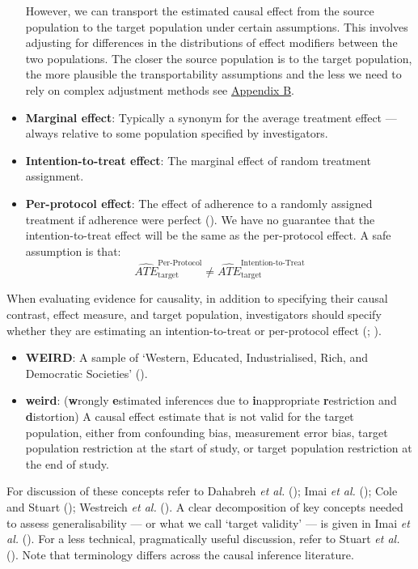 \documentclass[
  single column]{article}
\begin{document}
\begin{itemize}
  However, we can transport the estimated causal effect from the source
  population to the target population under certain assumptions. This
  involves adjusting for differences in the distributions of effect
  modifiers between the two populations. The closer the source
  population is to the target population, the more plausible the
  transportability assumptions and the less we need to rely on complex
  adjustment methods see \hyperref[id-app-b]{Appendix B}.
\item
  \textbf{Marginal effect}: Typically a synonym for the average
  treatment effect --- always relative to some population specified by
  investigators.
\item
  \textbf{Intention-to-treat effect}: The marginal effect of random
  treatment assignment.
\item
  \textbf{Per-protocol effect}: The effect of adherence to a randomly
  assigned treatment if adherence were perfect
  (). We have no
  guarantee that the intention-to-treat effect will be the same as the
  per-protocol effect. A safe assumption is that: \[
  \widehat{ATE}_{\text{target}}^{\text{Per-Protocol}} \ne \widehat{ATE}_{\text{target}}^{\text{Intention-to-Treat}}
  \]
\end{itemize}

When evaluating evidence for causality, in addition to specifying their
causal contrast, effect measure, and target population, investigators
should specify whether they are estimating an intention-to-treat or
per-protocol effect (;
).

\begin{itemize}
\item
  \textbf{WEIRD}: A sample of `Western, Educated, Industrialised, Rich,
  and Democratic Societies' ().
\item
  \textbf{weird}: (\textbf{w}rongly \textbf{e}stimated inferences due to
  \textbf{i}nappropriate \textbf{r}estriction and \textbf{d}istortion) A
  causal effect estimate that is not valid for the target population,
  either from confounding bias, measurement error bias, target
  population restriction at the start of study, or target population
  restriction at the end of study.
\end{itemize}

For discussion of these concepts refer to Dahabreh \emph{et al.}
(); Imai \emph{et al.}
(); Cole and Stuart
(); Westreich \emph{et al.}
(). A clear
decomposition of key concepts needed to assess generalisability --- or
what we call `target validity' --- is given in Imai \emph{et al.}
(). For a less technical,
pragmatically useful discussion, refer to Stuart \emph{et al.}
(). Note that terminology
differs across the causal inference literature.
\end{document}
